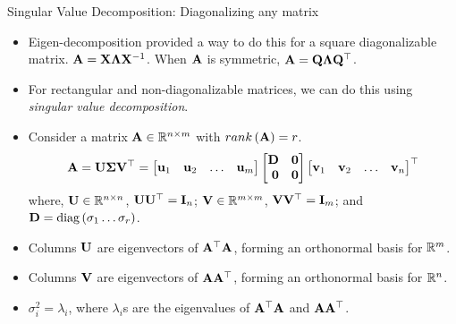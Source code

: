 \documentclass[aspectratio=169]{beamer}
\let\olditem\item
\renewcommand{\item}{\setlength{\itemsep}{\fill}\olditem}
\def\mf{\ensuremath\mathbf}
\def\mb{\ensuremath\mathbb}
\def\lp{\ensuremath\left(}
\def\rp{\ensuremath\right)}
\def\bmx{\ensuremath\begin{bmatrix*}[r]}
\def\emx{\ensuremath\end{bmatrix*}}
\begin{document}
\begin{frame}[t]{Singular Value Decomposition: Diagonalizing any matrix}
\begin{itemize}
    \item Eigen-decomposition provided a way to do this for a square diagonalizable matrix. $\mf{A} = \mf{X}\mf{\Lambda}\mf{X}^{-1}$. When $\mf{A}$ is symmetric, $\mf{A} = \mf{Q}\mf{\Lambda}\mf{Q}^\top$.

    \item For rectangular and non-diagonalizable matrices, we can do this using \textit{singular value decomposition}.

    \item Consider a matrix $\mf{A} \in \mb{R}^{n \times m}$ with $rank\lp\mf{A}\rp = r$.
    \[ \mf{A} = \mf{U}\mf{\Sigma}\mf{V}^\top = \bmx \mf{u}_1 & \mf{u}_2 & \ldots & \mf{u}_m\emx
    \bmx \mf{D} & \mf{0}\\
    \mf{0} & \mf{0} \emx \bmx \mf{v}_1 & \mf{v}_2 & \ldots & \mf{v}_n \emx^\top\]
    where, $\mf{U} \in \mb{R}^{n \times n}$, $\mf{U}\mf{U}^\top = \mf{I}_n$; $\mf{V}\in \mb{R}^{m \times m}$, $\mf{V}\mf{V}^\top = \mf{I}_m$; and $\mf{D} = \mathrm{diag}\lp\sigma_1 \ldots \sigma_r\rp$.

    \item Columns $\mf{U}$ are eigenvectors of $\mf{A}^\top\mf{A}$, forming an orthonormal basis for $\mb{R}^m$.

    \item Columns $\mf{V}$ are eigenvectors of $\mf{A}\mf{A}^\top$, forming an orthonormal basis for $\mb{R}^n$.

    \item $\sigma_i^2 = \lambda_i$, where $\lambda_i$s are the eigenvalues of $\mf{A}^\top\mf{A}$ and $\mf{A}\mf{A}^\top$.
\end{itemize}
\end{frame}
\end{document}
